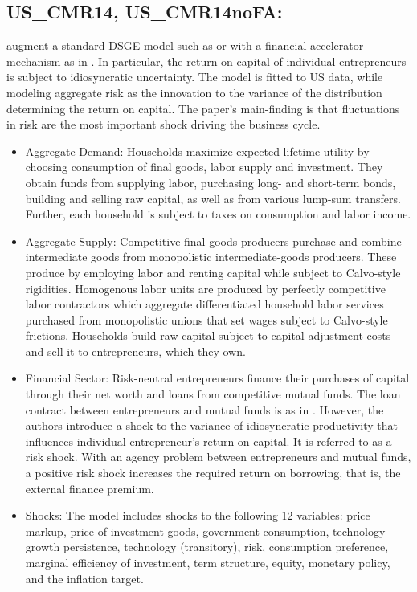 \documentclass[11pt,a4paper]{article}
\begin{document}
	
	\subsection{US\_CMR14, US\_CMR14noFA:\cite{CMR2014}}
	\label{USCMR14}	
	\cite{CMR2014} augment a standard DSGE model such as \cite{SmetsWouters2003} or \cite{SmetsWouters2007} with a financial accelerator mechanism as in \cite{BernankeGertlerGilchrist1999}. In particular, the return on capital of individual entrepreneurs is subject to idiosyncratic uncertainty. The model is fitted to US data, while modeling aggregate risk as the innovation to the variance of the distribution determining the return on capital. The paper's main-finding is that fluctuations in risk are the most important shock driving the business cycle.
	\begin{itemize}
		\item Aggregate Demand: Households maximize expected lifetime utility by choosing consumption of final goods, labor supply and investment. They obtain funds from supplying labor, purchasing long- and short-term bonds, building and selling raw capital, as well as from various lump-sum transfers. Further, each household is subject to taxes on consumption and labor income.
		\item Aggregate Supply: Competitive final-goods producers purchase and combine intermediate goods from monopolistic intermediate-goods producers. These produce by employing labor and renting capital while subject to Calvo-style rigidities. Homogenous labor units are produced by perfectly competitive labor contractors which aggregate differentiated household labor services purchased from monopolistic unions that set wages subject to Calvo-style frictions. Households build raw capital subject to capital-adjustment costs and sell it to entrepreneurs, which they own.
		\item Financial Sector: Risk-neutral entrepreneurs finance their purchases of capital through their net worth and loans from competitive mutual funds. The loan contract between entrepreneurs and mutual funds is as in \cite{BernankeGertlerGilchrist1999}. However, the authors introduce a shock to the variance of idiosyncratic productivity that influences individual entrepreneur's return on capital. It is referred to as a risk shock. With an agency problem between entrepreneurs and
		mutual funds, a positive risk shock increases the required return on borrowing, that
		is, the external finance premium.
		\item Shocks: The model includes shocks to the following 12 variables: price markup, price of investment goods, government consumption, technology growth persistence, technology (transitory), risk, consumption preference, marginal efficiency of investment, term structure, equity, monetary policy, and the inflation target.

\end{itemize}
\end{document}
